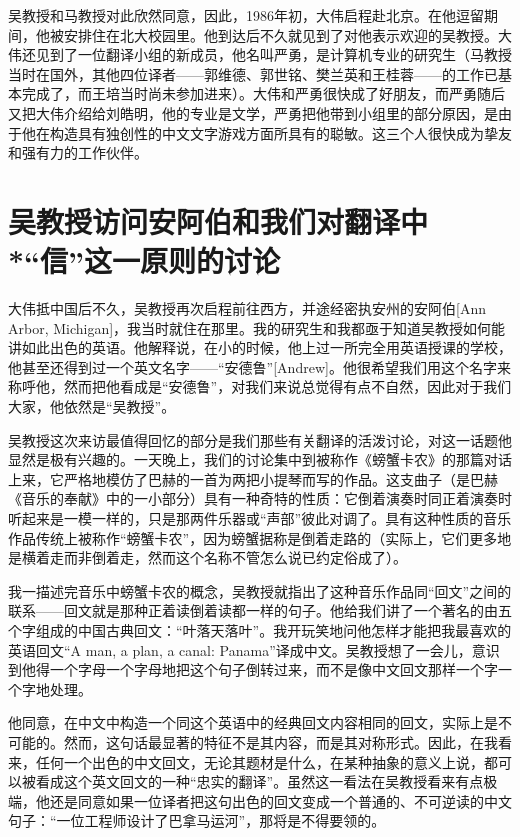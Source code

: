 吴教授和马教授对此欣然同意，因此，1986年初，大伟启程赴北京。在他逗留期间，他被安排住在北大校园里。他到达后不久就见到了对他表示欢迎的吴教授。大伟还见到了一位翻译小组的新成员，他名叫严勇，是计算机专业的研究生（马教授当时在国外，其他四位译者——郭维德、郭世铭、樊兰英和王桂蓉——的工作已基本完成了，而王培当时尚未参加进来）。大伟和严勇很快成了好朋友，而严勇随后又把大伟介绍给刘皓明，他的专业是文学，严勇把他带到小组里的部分原因，是由于他在构造具有独创性的中文文字游戏方面所具有的聪敏。这三个人很快成为挚友和强有力的工作伙伴。

\section{吴教授访问安阿伯和我们对翻译中\\*“信”这一原则的讨论}

大伟抵中国后不久，吴教授再次启程前往西方，并途经密执安州的安阿伯[Ann Arbor, Michigan]，我当时就住在那里。我的研究生和我都亟于知道吴教授如何能讲如此出色的英语。他解释说，在小的时候，他上过一所完全用英语授课的学校，他甚至还得到过一个英文名字——“安德鲁”[Andrew]。他很希望我们用这个名字来称呼他，然而把他看成是“安德鲁”，对我们来说总觉得有点不自然，因此对于我们大家，他依然是“吴教授”。

吴教授这次来访最值得回忆的部分是我们那些有关翻译的活泼讨论，对这一话题他显然是极有兴趣的。一天晚上，我们的讨论集中到被称作《螃蟹卡农》的那篇对话上来，它严格地模仿了巴赫的一首为两把小提琴而写的作品。这支曲子（是巴赫《音乐的奉献》中的一小部分）具有一种奇特的性质：它倒着演奏时同正着演奏时听起来是一模一样的，只是那两件乐器或“声部”彼此对调了。具有这种性质的音乐作品传统上被称作“螃蟹卡农”，因为螃蟹据称是倒着走路的（实际上，它们更多地是横着走而非倒着走，然而这个名称不管怎么说已约定俗成了）。

我一描述完音乐中螃蟹卡农的概念，吴教授就指出了这种音乐作品同“回文”之间的联系——回文就是那种正着读倒着读都一样的句子。他给我们讲了一个著名的由五个字组成的中国古典回文：“叶落天落叶”。我开玩笑地问他怎样才能把我最喜欢的英语回文“A man, a plan, a canal: Panama”译成中文。吴教授想了一会儿，意识到他得一个字母一个字母地把这个句子倒转过来，而不是像中文回文那样一个字一个字地处理。

他同意，在中文中构造一个同这个英语中的经典回文内容相同的回文，实际上是不可能的。然而，这句话最显著的特征不是其内容，而是其对称形式。因此，在我看来，任何一个出色的中文回文，无论其题材是什么，在某种抽象的意义上说，都可以被看成这个英文回文的一种“忠实的翻译”。虽然这一看法在吴教授看来有点极端，他还是同意如果一位译者把这句出色的回文变成一个普通的、不可逆读的中文句子：“一位工程师设计了巴拿马运河”，那将是不得要领的。

